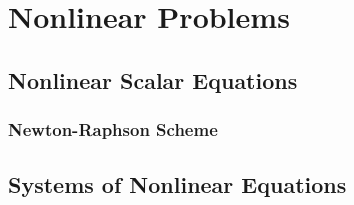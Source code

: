 %
\chapter{Nonlinear Problems}

\section{Nonlinear Scalar Equations}


\subsection{Newton-Raphson Scheme}


\section{Systems of Nonlinear Equations}
